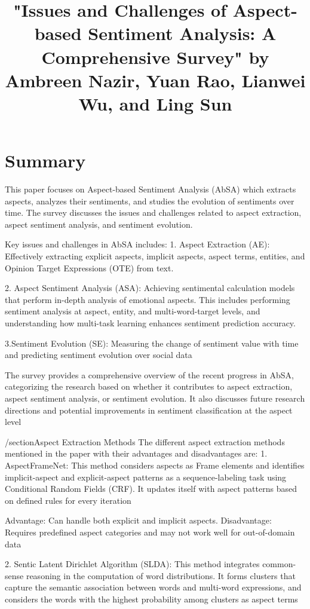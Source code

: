 \title{"Issues and Challenges of Aspect-based Sentiment Analysis: A Comprehensive Survey" by Ambreen Nazir, Yuan Rao, Lianwei Wu, and Ling Sun}
\cite{NazirIssues&Chall2023}
\section{Summary}
 This paper focuses on Aspect-based Sentiment Analysis (AbSA) which extracts aspects, analyzes their sentiments, and studies the evolution of sentiments over time. The survey discusses the issues and challenges related to aspect extraction, aspect sentiment analysis, and sentiment evolution.

 Key issues and challenges in AbSA includes:
 1. Aspect Extraction (AE): Effectively extracting explicit aspects, implicit aspects, aspect terms, entities, and Opinion Target Expressions (OTE) from text.
 
 2. Aspect Sentiment Analysis (ASA): Achieving sentimental calculation models that perform in-depth analysis of emotional aspects. This includes performing sentiment analysis at aspect, entity, and multi-word-target levels, and understanding how multi-task learning enhances sentiment prediction accuracy.

 3.Sentiment Evolution (SE): Measuring the change of sentiment value with time and predicting sentiment evolution over social data

 The survey provides a comprehensive overview of the recent progress in AbSA, categorizing the research based on whether it contributes to aspect extraction, aspect sentiment analysis, or sentiment evolution. It also discusses future research directions and potential improvements in sentiment classification at the aspect level

 /section{Aspect Extraction Methods}
The different aspect extraction methods mentioned in the paper with their advantages and disadvantages are:
1. AspectFrameNet: This method considers aspects as Frame elements and identifies implicit-aspect and explicit-aspect patterns as a sequence-labeling task using Conditional Random Fields (CRF). It updates itself with aspect patterns based on defined rules for every iteration

Advantage: Can handle both explicit and implicit aspects.
Disadvantage: Requires predefined aspect categories and may not work well for out-of-domain data

2. Sentic Latent Dirichlet Algorithm (SLDA): This method integrates common-sense reasoning in the computation of word distributions. It forms clusters that capture the semantic association between words and multi-word expressions, and considers the words with the highest probability among clusters as aspect terms

